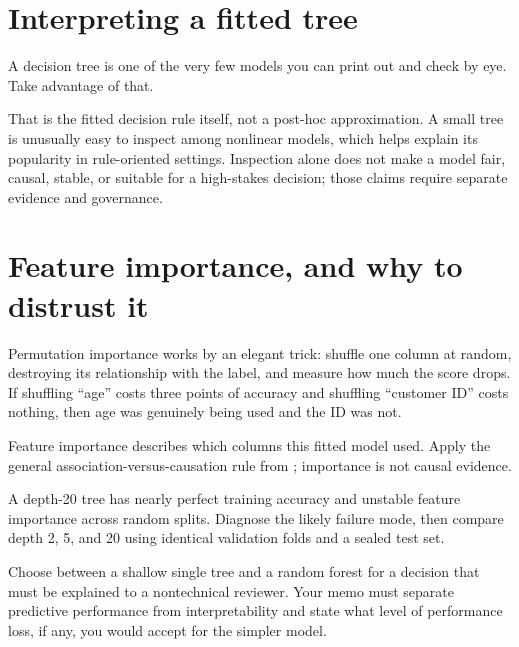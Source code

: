 \section{Interpreting a fitted tree}

A decision tree is one of the very few models you can print out and check by eye. Take advantage of that.

\begin{keyidea}
That is the fitted decision rule itself, not a post-hoc approximation. A small tree is unusually easy to inspect among nonlinear models, which helps explain its popularity in rule-oriented settings. Inspection alone does not make a model fair, causal, stable, or suitable for a high-stakes decision; those claims require separate evidence and governance.
\end{keyidea}

\section{Feature importance, and why to distrust it}
\label{sec:tree-feature-importance}

\begin{workedexample}
Permutation importance works by an elegant trick: shuffle one column at random, destroying its relationship with the label, and measure how much the score drops. If shuffling ``age'' costs three points of accuracy and shuffling ``customer ID'' costs nothing, then age was genuinely being used and the ID was not.
\end{workedexample}

\begin{keyidea}
Feature importance describes which columns this fitted model used. Apply the general association-versus-causation rule from ; importance is not causal evidence.
\end{keyidea}

\begin{debugtask}
A depth-20 tree has nearly perfect training accuracy and unstable feature importance across random splits. Diagnose the likely failure mode, then compare depth 2, 5, and 20 using identical validation folds and a sealed test set.
\end{debugtask}

\begin{decisionmemo}
Choose between a shallow single tree and a random forest for a decision that must be explained to a nontechnical reviewer. Your memo must separate predictive performance from interpretability and state what level of performance loss, if any, you would accept for the simpler model.
\end{decisionmemo}


